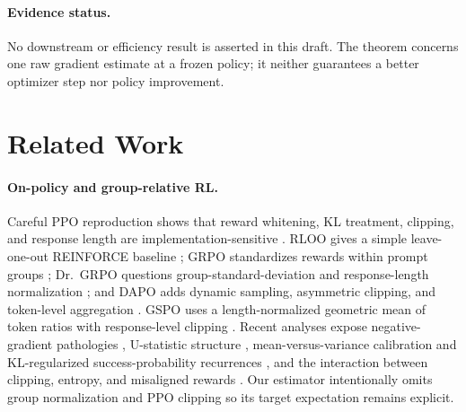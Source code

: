 \documentclass{article}
\begin{document}
\paragraph{Evidence status.}
No downstream or efficiency result is asserted in this draft. The theorem
concerns one raw gradient estimate at a frozen policy; it neither guarantees a
better optimizer step nor policy improvement.


\section{Related Work}
\label{sec:related}

\paragraph{On-policy and group-relative RL.}
Careful PPO reproduction shows that reward whitening, KL treatment, clipping,
and response length are implementation-sensitive
\cite{huang2024nplus}. RLOO gives a simple leave-one-out REINFORCE baseline
\cite{ahmadian2024back}; GRPO standardizes rewards within prompt groups
\cite{shao2024deepseekmath}; Dr.\ GRPO questions group-standard-deviation and
response-length normalization \cite{liu2025critical}; and DAPO adds dynamic
sampling, asymmetric clipping, and token-level aggregation
\cite{yu2025dapo}. GSPO uses a length-normalized geometric mean of token ratios
with response-level clipping \cite{zheng2025gspo}. Recent analyses expose
negative-gradient pathologies
\cite{deng2025negative}, U-statistic structure \cite{zhou2026ustatistic},
mean-versus-variance calibration and KL-regularized success-probability
recurrences \cite{mroueh2026grpo}, and
the interaction between clipping, entropy, and misaligned rewards
\cite{chen2026exploration}. Our estimator intentionally omits group
normalization and PPO clipping so its target expectation remains explicit.
\end{document}
